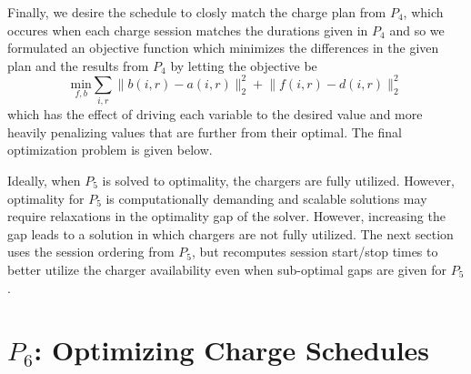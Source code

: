 \par Finally, we desire the schedule to closly match the charge plan from $P_4$, which occures when each charge session matches the durations given in $P_4$ and so we formulated an objective function which minimizes the differences in the given plan and the results from $P_4$ by letting the objective be
\begin{equation}\label{eqn:assignment:eqn6}
	\underset{f,b}{\text{min}} \sum_{i,r}\lVert b(i,r) - a(i,r)\rVert_2^2 + \lVert f(i,r) - d(i,r) \rVert_2^2
\end{equation}
which has the effect of driving each variable to the desired value and more heavily penalizing values that are further from their optimal.
The final optimization problem is given below.\\[0.1in]

\par Ideally, when $P_5$ is solved to optimality, the chargers are fully utilized. However, optimality for $P_5$ is computationally demanding and scalable solutions may require relaxations in the optimality gap of the solver.  However, increasing the gap leads to a solution in which chargers are not fully utilized. The next section uses the session ordering from $P_5$, but recomputes session start/stop times to better utilize the charger availability even when sub-optimal gaps are given for $P_5$.


\section{$P_6$: Optimizing Charge Schedules\label{sec:optimizingChargeSchedules}}

